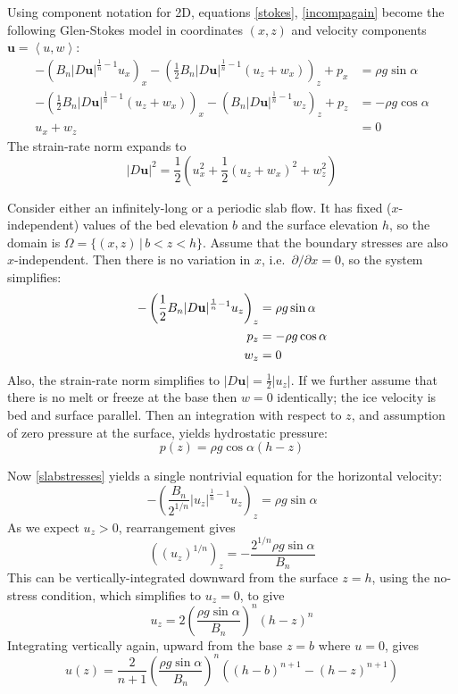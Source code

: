 \documentclass[letterpaper,final,12pt,reqno]{amsart}
\newcommand{\bu}{\mathbf{u}}
\begin{document}
Using component notation for 2D, equations \eqref{stokes}, \eqref{incompagain} become the following Glen-Stokes model in coordinates $(x,z)$ and velocity components $\bu=\left<u,w\right>$:
\begin{align}
- \left(B_n |D\bu|^{\frac{1}{n}-1} u_x\right)_x - \left(\frac{1}{2} B_n |D\bu|^{\frac{1}{n}-1} \left(u_z+w_x\right)\right)_z + p_x &= \rho g\sin\alpha \label{planestressx} \\
- \left(\frac{1}{2} B_n |D\bu|^{\frac{1}{n}-1} \left(u_z+w_x\right)\right)_x - \left(B_n |D\bu|^{\frac{1}{n}-1} w_z\right)_z + p_z &= -\rho g\cos\alpha \label{planestressz} \\
u_x + w_z &= 0 \label{planeincomp}
\end{align}
The strain-rate norm expands to
\begin{equation}
    |D\bu|^2 = \frac{1}{2} \left(u_x^2 + \frac{1}{2}(u_z+w_x)^2 + w_z^2\right)  \label{planeDnorm}
\end{equation}

Consider either an infinitely-long or a periodic slab flow.  It has fixed ($x$-independent) values of the bed elevation $b$ and the surface elevation $h$, so the domain is $\Omega = \{(x,z)\,|\,b < z < h\}$.  Assume that the boundary stresses are also $x$-independent.  Then there is no variation in $x$, i.e.~$\partial/\partial x=0$, so the system simplifies:
\begin{align}
- \left(\frac{1}{2}B_n |D\bu|^{\frac{1}{n}-1} u_z\right)_z &= \rho g\sin\alpha \label{slabstresses} \\
p_z &= -\rho g\cos\alpha \notag \\
w_z &= 0 \notag
\end{align}
Also, the strain-rate norm simplifies to $|D\bu| = \frac{1}{2} |u_z|$.  If we further assume that there is no melt or freeze at the base then $w=0$ identically; the ice velocity is bed and surface parallel.  Then an integration with respect to $z$, and assumption of zero pressure at the surface, yields hydrostatic pressure:
\begin{equation}
p(z) = \rho g\cos\alpha (h-z)  \label{pslab}
\end{equation}

Now \eqref{slabstresses} yields a single nontrivial equation for the horizontal velocity:
    $$- \left(\frac{B_n}{2^{1/n}} |u_z|^{\frac{1}{n}-1} u_z\right)_z = \rho g\sin\alpha$$
As we expect $u_z>0$, rearrangement gives
    $$\left((u_z)^{1/n} \right)_z = - \frac{2^{1/n} \rho g\sin\alpha}{B_n}$$
This can be vertically-integrated downward from the surface $z=h$, using the no-stress condition, which simplifies to $u_z=0$, to give
\begin{equation}
u_z = 2 \left(\frac{\rho g\sin\alpha}{B_n}\right)^n (h-z)^n  \label{uzslab}
\end{equation}
Integrating vertically again, upward from the base $z=b$ where $u=0$, gives
\begin{equation}
u(z) = \frac{2}{n+1} \left(\frac{\rho g\sin\alpha}{B_n}\right)^n \left((h-b)^{n+1} - (h-z)^{n+1}\right)  \label{uslab}
\end{equation}
\end{document}
